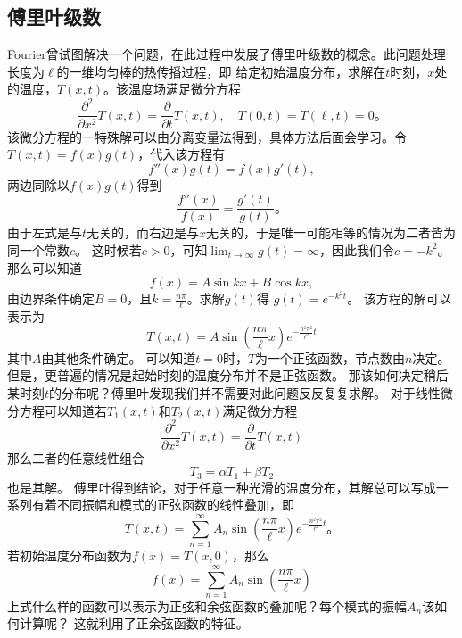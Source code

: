 \subsection{傅里叶级数}
\label{subsec:fourier_series}
Fourier曾试图解决一个问题，在此过程中发展了傅里叶级数的概念。此问题处理长度为$\ell$的一维均匀棒的热传播过程，即
给定初始温度分布，求解在$t$时刻，$x$处的温度，$T(x,t)$。该温度场满足微分方程
\[
\frac{\partial^2}{\partial x^2} T(x,t) = \frac{\partial}{\partial t} T(x,t), \quad  T(0,t) = T(\ell,t) = 0 \textrm{。}  
\]
该微分方程的一特殊解可以由分离变量法得到，具体方法后面会学习。令$T(x,t) = f(x) g(t)$，代入该方程有
\[
  f''(x) g(t) = f(x) g'(t) ,
\]
两边同除以$f(x)g(t)$得到
\[
\frac{f''(x)}{f(x)} = \frac{g'(t)}{g(t)}   \textrm{。}
\]
由于左式是与$t$无关的，而右边是与$x$无关的，于是唯一可能相等的情况为二者皆为同一个常数$c$。
这时候若$c>0$，可知$\lim_{t\to \infty} g(t) = \infty$，因此我们令$c=-k^2$。
那么可以知道
\[
f(x) =  A \sin{k x} + B \cos{k x},    
\]
由边界条件确定$B = 0$，且$k = \frac{n\pi}{\ell}$。求解$g(t)$得 $g(t) = e^{-k^2 t}$。
该方程的解可以表示为
\[
T(x,t) = A \sin{\left( \frac{n\pi}{\ell} x \right)} e^{-\frac{n^2\pi^2}{\ell^2} t}  
\]
其中$A$由其他条件确定。
可以知道$t=0$时，$T$为一个正弦函数，节点数由$n$决定。但是，更普遍的情况是起始时刻的温度分布并不是正弦函数。
那该如何决定稍后某时刻$t$的分布呢？傅里叶发现我们并不需要对此问题反反复复求解。
对于线性微分方程可以知道若$T_1(x,t)$和$T_2(x,t)$满足微分方程
\[
    \frac{\partial^2}{\partial x^2} T(x,t) = \frac{\partial}{\partial t} T(x,t)
\]
那么二者的任意线性组合
\[
T_3 = \alpha T_1  + \beta T_2  
\]
也是其解。
傅里叶得到结论，对于任意一种光滑的温度分布，其解总可以写成一系列有着不同振幅和模式的正弦函数的线性叠加，即
\[
  T(x,t) = \sum_{n=1}^{\infty} A_n \sin {\left( \frac{n\pi}{\ell} x \right)} e^{-\frac{n^2\pi^2}{\ell^2} t} \textrm{。}     
\]
若初始温度分布函数为$f(x) = T(x,0)$，那么
\[
  f(x) =      \sum_{n=1}^{\infty} A_n \sin {\left( \frac{n\pi}{\ell} x \right)}
\]
上式什么样的函数可以表示为正弦和余弦函数的叠加呢？每个模式的振幅$A_n$该如何计算呢？
这就利用了正余弦函数的特征。